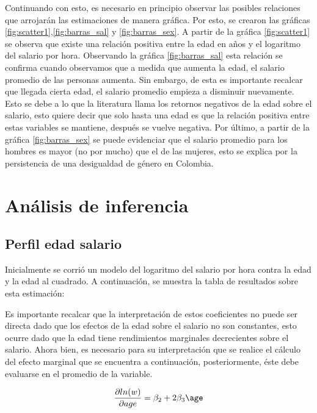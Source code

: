\documentclass[12pt]{article}
\begin{document}





Continuando con esto, es necesario en principio observar las posibles relaciones que arrojarán las estimaciones de manera gráfica. Por esto, se crearon las gráficas \ref{fig:scatter1},\ref{fig:barras_sal} y \ref{fig:barras_sex}. A partir de la gráfica \ref{fig:scatter1} se observa que existe una relación positiva entre la edad en años y el logaritmo del salario por hora. Observando la gráfica \ref{fig:barras_sal} esta relación se confirma cuando observamos que a medida que aumenta la edad, el salario promedio de las personas aumenta. Sin embargo, de esta es importante recalcar que llegada cierta edad, el salario promedio empieza a disminuir nuevamente. Esto se debe a lo que la literatura llama los retornos negativos de la edad sobre el salario, esto quiere decir que solo hasta una edad es que la relación positiva entre estas variables se mantiene, después se vuelve negativa. Por último, a partir de la gráfica \ref{fig:barras_sex} se puede evidenciar que el salario promedio para los hombres es mayor (no por mucho) que el de las mujeres, esto se explica por la persistencia de una desigualdad de género en Colombia.

\section{Análisis de inferencia}

\subsection{Perfil edad salario}

Inicialmente se corrió un modelo del logaritmo del salario por hora contra la edad y la edad al cuadrado. A continuación, se muestra la tabla de resultados sobre esta estimación:


Es importante recalcar que la interpretación de estos coeficientes no puede ser directa dado que los efectos de la edad sobre el salario no son constantes, esto ocurre dado que la edad tiene rendimientos marginales decrecientes sobre el salario. Ahora bien, es necesario para su interpretación que se realice el cálculo del efecto marginal que se encuentra a continuación, posteriormente, éste debe evaluarse en el promedio de la variable.

$$\frac{\partial ln(w)}{\partial age}=\beta_2+2 \beta_3\age$$
\end{document}
